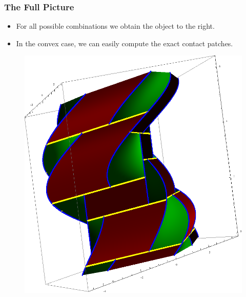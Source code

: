 \documentclass[ucs,9pt,pagenumbersfull]{beamer}
\begin{document}
\begin{frame}
  \frametitle{The Full Picture}
  \begin{minipage}{0.4\linewidth}
    \begin{itemize}
    \item<1-> For all possible combinations we obtain the object to
      the right.
    \item<1-> In the convex case, we can easily compute the exact
      contact patches.
    \end{itemize}
  \end{minipage}
  \begin{minipage}{0.45\linewidth}
    \begin{figure}
      \centering
      \includegraphics[height=0.95\textheight]{Figures/full_contact}
    \end{figure}
  \end{minipage}
\end{frame}
\end{document}
